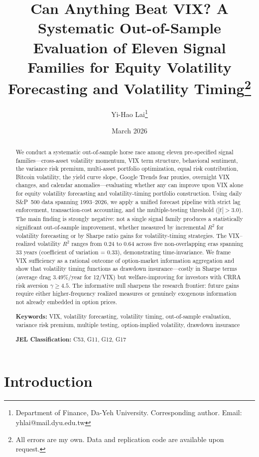 \documentclass[12pt,a4paper]{article}
\title{Can Anything Beat VIX? A Systematic Out-of-Sample Evaluation of Eleven Signal Families for Equity Volatility Forecasting and Volatility Timing\thanks{All errors are my own. Data and replication code are available upon request.}}
\author{Yi-Hao Lai\thanks{Department of Finance, Da-Yeh University. Corresponding author. Email: yhlai@mail.dyu.edu.tw}}
\date{March 2026}
\begin{document}
\maketitle

\begin{abstract}
\noindent
We conduct a systematic out-of-sample horse race among eleven pre-specified signal families---cross-asset volatility momentum, VIX term structure, behavioral sentiment, the variance risk premium, multi-asset portfolio optimization, equal risk contribution, Bitcoin volatility, the yield curve slope, Google Trends fear proxies, overnight VIX changes, and calendar anomalies---evaluating whether any can improve upon VIX alone for equity volatility forecasting and volatility-timing portfolio construction. Using daily S\&P~500 data spanning 1993--2026, we apply a unified forecast pipeline with strict lag enforcement, transaction-cost accounting, and the \citet{harvey2016} multiple-testing threshold ($|t|>3.0$). The main finding is strongly negative: not a single signal family produces a statistically significant out-of-sample improvement, whether measured by incremental $R^2$ for volatility forecasting or by Sharpe ratio gains for volatility-timing strategies. The VIX--realized volatility $R^2$ ranges from 0.24 to 0.64 across five non-overlapping eras spanning 33 years (coefficient of variation = 0.33), demonstrating time-invariance. We frame VIX sufficiency as a rational outcome of option-market information aggregation and show that volatility timing functions as drawdown insurance---costly in Sharpe terms (average drag 3.49\%/year for 12/VIX) but welfare-improving for investors with CRRA risk aversion $\gamma \geq 4.5$. The informative null sharpens the research frontier: future gains require either higher-frequency realized measures or genuinely exogenous information not already embedded in option prices.

\medskip
\noindent
\textbf{Keywords:} VIX, volatility forecasting, volatility timing, out-of-sample evaluation, variance risk premium, multiple testing, option-implied volatility, drawdown insurance

\medskip
\noindent
\textbf{JEL Classification:} C53, G11, G12, G17
\end{abstract}

\newpage
\tableofcontents
\newpage

\section{Introduction}
\label{sec:intro}
\end{document}
